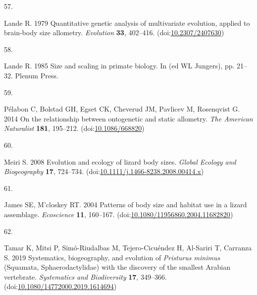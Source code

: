 \documentclass[
  11pt,
]{article}
\newlength{\cslhangindent}
\newlength{\csllabelwidth}
\newlength{\cslentryspacingunit} %
\newenvironment{CSLReferences}[2] %
 {%
  \setlength{\parindent}{0pt}
  \ifodd #1
  \let\oldpar\par
  \def\par{\hangindent=\cslhangindent\oldpar}
  \fi
  \setlength{\parskip}{#2\cslentryspacingunit}
 }%
 {}
\newcommand{\CSLLeftMargin}[1]{\parbox[t]{\csllabelwidth}{#1}}
\newcommand{\CSLRightInline}[1]{\parbox[t]{\linewidth - \csllabelwidth}{#1}\break}
\providecommand{\DIFaddbegin}{} %
\providecommand{\DIFaddend}{} %
\providecommand{\DIFdelbegin}{} %
\providecommand{\DIFdelend}{} %
\newcommand{\DIFscaledelfig}{0.5}
\newlength{\DIFdelgraphicswidth} %
\newlength{\DIFdelgraphicsheight} %
\newcommand{\DIFaddincludegraphics}[2][]{{\color{blue}\fbox{\DIFOincludegraphics[#1]{#2}}}} %
\newcommand{\DIFdelincludegraphics}[2][]{%
\sbox{\DIFdelgraphicsbox}{\DIFOincludegraphics[#1]{#2}}%
\settoboxwidth{\DIFdelgraphicswidth}{\DIFdelgraphicsbox} %
\settoboxtotalheight{\DIFdelgraphicsheight}{\DIFdelgraphicsbox} %
\scalebox{\DIFscaledelfig}{%
\parbox[b]{\DIFdelgraphicswidth}{\usebox{\DIFdelgraphicsbox}\\[-\baselineskip] \rule{\DIFdelgraphicswidth}{0em}}\llap{\resizebox{\DIFdelgraphicswidth}{\DIFdelgraphicsheight}{%
\setlength{\unitlength}{\DIFdelgraphicswidth}%
\begin{picture}(1,1)%
\thicklines\linethickness{2pt} %
{\color[rgb]{1,0,0}\put(0,0){\framebox(1,1){}}}%
{\color[rgb]{1,0,0}\put(0,0){\line( 1,1){1}}}%
{\color[rgb]{1,0,0}\put(0,1){\line(1,-1){1}}}%
\end{picture}%
}\hspace*{3pt}}} %
} %
\DeclareRobustCommand{\DIFaddbegin}{\DIFOaddbegin \let\includegraphics\DIFaddincludegraphics} %
\DeclareRobustCommand{\DIFaddend}{\DIFOaddend \let\includegraphics\DIFOincludegraphics} %
\DeclareRobustCommand{\DIFdelbegin}{\DIFOdelbegin \let\includegraphics\DIFdelincludegraphics} %
\DeclareRobustCommand{\DIFdelend}{\DIFOaddend \let\includegraphics\DIFOincludegraphics} %
\begin{document}
\begin{CSLReferences}{0}{0}
\leavevmode{}%
\CSLLeftMargin{57. }%
\CSLRightInline{Lande R. 1979 Quantitative genetic analysis of
multivariate evolution, applied to brain-body size allometry.
\emph{Evolution} \textbf{33}, 402--416.
(doi:\href{https://doi.org/10.2307/2407630}{10.2307/2407630})}

\leavevmode{}%
\CSLLeftMargin{58. }%
\CSLRightInline{Lande R. 1985 Size and scaling in primate biology. In
(ed WL Jungers), pp. 21--32. Plenum Press. }

\leavevmode{}%
\CSLLeftMargin{59. }%
\CSLRightInline{Pélabon C, Bolstad GH, Egset CK, Cheverud JM, Pavlicev
M, Rosenqvist G. 2014 On the relationship between ontogenetic and static
allometry. \emph{The American Naturalist} \textbf{181}, 195--212.
(doi:\href{https://doi.org/10.1086/668820}{10.1086/668820})}

\leavevmode{}%
\CSLLeftMargin{60. }%
\CSLRightInline{Meiri S. 2008 Evolution and ecology of lizard body
sizes. \emph{Global Ecology and Biogeography} \textbf{17}, 724--734.
(doi:\href{https://doi.org/10.1111/j.1466-8238.2008.00414.x}{10.1111/j.1466-8238.2008.00414.x})}

\leavevmode{}%
\CSLLeftMargin{61. }%
\CSLRightInline{James SE, M'closkey RT. 2004 Patterns of body size and
habitat use in a lizard assemblage. \emph{Ecoscience} \textbf{11},
160--167.
(doi:\href{https://doi.org/10.1080/11956860.2004.11682820}{10.1080/11956860.2004.11682820})}

\leavevmode{}%
\CSLLeftMargin{62. }%
\DIFdelbegin %
\DIFdelend \DIFaddbegin \CSLRightInline{Tamar K, Mitsi P, Simó-Riudalbas M, Tejero-Cicuéndez H,
Al-Sariri T, Carranza S. 2019 Systematics, biogeography, and evolution
of \emph{{P}risturus minimus} ({S}quamata, {S}phaerodactylidae) with the
discovery of the smallest {A}rabian vertebrate. \emph{Systematics and
Biodiversity} \textbf{17}, 349--366.
(doi:\href{https://doi.org/10.1080/14772000.2019.1614694}{10.1080/14772000.2019.1614694})}
\DIFaddend 


\end{CSLReferences}
\end{document}
